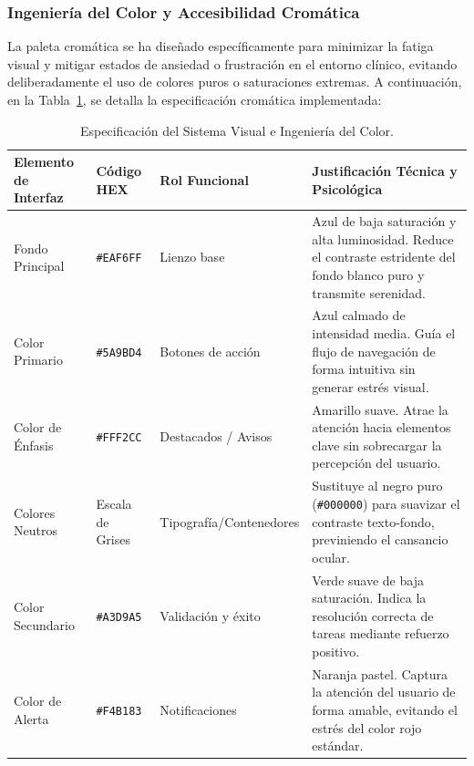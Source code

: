 \subsubsection{Ingeniería del Color y Accesibilidad Cromática}
La paleta cromática se ha diseñado específicamente para minimizar la fatiga visual y mitigar estados de ansiedad o frustración en el entorno clínico, evitando deliberadamente el uso de colores puros o saturaciones extremas. A continuación, en la Tabla~\ref{tab:sistema_visual}, se detalla la especificación cromática implementada:
\begin{table}[H]
\centering
\small
\renewcommand{\arraystretch}{1.3}
\begin{tabularx}{\textwidth}{|X|X|X|X|}
\hline
\textbf{Elemento de Interfaz} & \textbf{Código HEX} & \textbf{Rol Funcional} & \textbf{Justificación Técnica y Psicológica} \\ \hline
Fondo Principal & \texttt{\#EAF6FF} & Lienzo base & Azul de baja saturación y alta luminosidad. Reduce el contraste estridente del fondo blanco puro y transmite serenidad. \\ \hline
Color Primario & \texttt{\#5A9BD4} & Botones de acción & Azul calmado de intensidad media. Guía el flujo de navegación de forma intuitiva sin generar estrés visual. \\ \hline
Color de Énfasis & \texttt{\#FFF2CC} & Destacados / Avisos & Amarillo suave. Atrae la atención hacia elementos clave sin sobrecargar la percepción del usuario. \\ \hline
Colores Neutros & Escala de Grises & Tipografía/Contenedores & Sustituye al negro puro (\texttt{\#000000}) para suavizar el contraste texto-fondo, previniendo el cansancio ocular. \\ \hline
Color Secundario & \texttt{\#A3D9A5} & Validación y éxito & Verde suave de baja saturación. Indica la resolución correcta de tareas mediante refuerzo positivo. \\ \hline
Color de Alerta & \texttt{\#F4B183} & Notificaciones & Naranja pastel. Captura la atención del usuario de forma amable, evitando el estrés del color rojo estándar. \\ \hline
\end{tabularx}
\caption{Especificación del Sistema Visual e Ingeniería del Color.}
\label{tab:sistema_visual}
\end{table}
\vspace{-\parskip}
